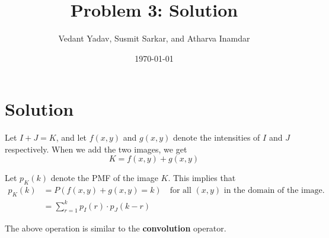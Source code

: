 \documentclass[12pt]{article}
\title{Problem 3: Solution}
\author{Vedant Yadav, Susmit Sarkar, and Atharva Inamdar}
\date{\today}
\begin{document}
\maketitle

\section*{Solution}

Let $I + J = K$, and let $f(x,y)$ and $g(x,y)$ denote the intensities of $I$ and $J$ respectively. When we add the two images, we get
\begin{equation}
    K = f(x,y) + g(x,y)
\end{equation}

Let $p_K(k)$ denote the PMF of the image $K$. This implies that
\begin{align}
    p_K(k) &= P(f(x,y) + g(x,y) = k) \quad \text{for all } (x,y) \text{ in the domain of the image.} \nonumber \\
    &= \boxed{\sum_{r = 1}^{k} p_I(r) \cdot p_J(k - r)}
\end{align}

The above operation is similar to the \textbf{convolution} operator.
\end{document}
